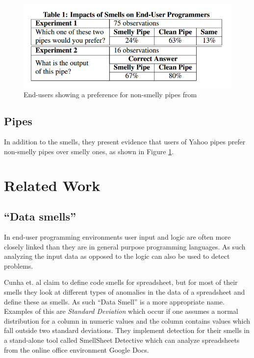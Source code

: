 \documentclass[10pt,conference,compsocconf]{IEEEtran}
\begin{document}
\begin{figure}
\centering
\includegraphics[width=\columnwidth]{Table1-Stolee2011}
\caption{End-users showing a preference for non-smelly pipes from \cite{Stolee2011}}
\label{fig:Table1-Stolee2011}
\end{figure}


\subsection{Pipes}

In addition to the smells, they present evidence that users of Yahoo pipes prefer non-smelly pipes over smelly ones, as shown in Figure \ref{fig:Table1-Stolee2011}.


\section{Related Work}
\label{sec:related_work}

\subsection{``Data smells''}
\label{subsec:related_datasmells}

In end-user programming environments user input and logic are often more closely linked than they are in general purpose programming languages.
As such analyzing the input data as opposed to the logic can also be used to detect problems.

Cunha et. al \cite{cunha2012towards} claim to define code smells for spreadsheet, but for most of their smells they look at different types of anomalies in the data of a spreadsheet and define these as smells.
As such ``Data Smell'' is a more appropriate name.
Examples of this are \textit{Standard Deviation} which occur if one assumes a normal distribution for a column in numeric values and the column contains values which fall outside two standard deviations.
They implement detection for their smells in a stand-alone tool called SmellSheet Detective which can analyze spreadsheets from the online office environment Google Docs.
\end{document}
